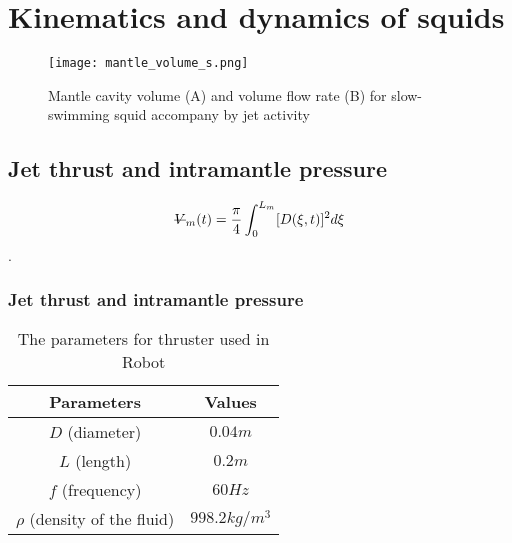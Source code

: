 \documentclass[main.tex]{subfiles}
\begin{document}
\section{Kinematics and dynamics of squids}

\lipsum[1-2]

\begin{figure}[h]
    \centering
    \texttt{[image: mantle\_volume\_s.png]}
    \caption{Mantle cavity volume (A) and volume flow rate (B) for slow-swimming squid accompany by jet activity\cite{Anderson2000}}
\end{figure}

\subsection{Jet thrust and intramantle pressure}

\lipsum[1-2]
\begin{equation}
    \text{\sout{$V$}}_m(t) = \frac{\pi}{4}\int_0^{L_m}[D(\xi,t)]^2d\xi
\end{equation}
\lipsum[1]\cite{Anderson2000}. 

\subsubsection{Jet thrust and intramantle pressure}

\lipsum[1-2]

\begin{table}[h]
    \centering
    \begin{tabular}{|c|c|}
    \hline
    Parameters                    & Values         \\ \hline
    $D$ (diameter)                & $0.04m$        \\ \hline
    $L$ (length)                  & $0.2m$         \\ \hline
    $f$ (frequency)               & $60Hz$         \\ \hline
    $\rho$ (density of the fluid) & $998.2 kg/m^3$ \\ \hline
    \end{tabular}
    \caption{The parameters for thruster used in Robot}
\end{table}
\end{document}
